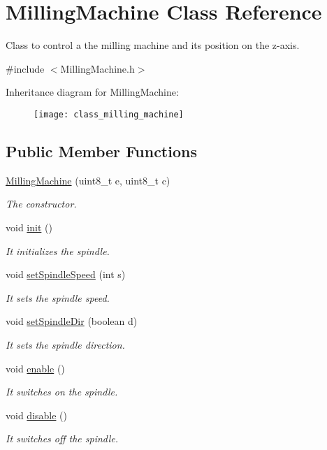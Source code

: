\hypertarget{class_milling_machine}{\section{Milling\+Machine Class Reference}
\label{class_milling_machine}
}


Class to control a the milling machine and its position on the z-\/axis.  




{\ttfamily \#include $<$Milling\+Machine.\+h$>$}

Inheritance diagram for Milling\+Machine\+:\begin{figure}[H]
\begin{center}
\leavevmode
\texttt{[image: class\_milling\_machine]}
\end{center}
\end{figure}
\subsection*{Public Member Functions}
\begin{DoxyCompactItemize}
\item 
\hyperlink{class_milling_machine_afdeaae37d959bd4c9de40195a2650aa4}{Milling\+Machine} (uint8\+\_\+t e, uint8\+\_\+t c)
\begin{DoxyCompactList}\small\item\em The constructor. \end{DoxyCompactList}\item 
void \hyperlink{class_milling_machine_ad8b30fc42959606e9773e5ae7e31bac7}{init} ()
\begin{DoxyCompactList}\small\item\em It initializes the spindle. \end{DoxyCompactList}\item 
void \hyperlink{class_milling_machine_a4c41fa0e6f882281ffc3b67a1771da57}{set\+Spindle\+Speed} (int s)
\begin{DoxyCompactList}\small\item\em It sets the spindle speed. \end{DoxyCompactList}\item 
void \hyperlink{class_milling_machine_a5c49cbbcd45406c9537ccac8f7c22c39}{set\+Spindle\+Dir} (boolean d)
\begin{DoxyCompactList}\small\item\em It sets the spindle direction. \end{DoxyCompactList}\item 
void \hyperlink{class_milling_machine_af965377184ed3bc3ed56763cd652d10f}{enable} ()
\begin{DoxyCompactList}\small\item\em It switches on the spindle. \end{DoxyCompactList}\item 
void \hyperlink{class_milling_machine_a6e1eb0b5f72e31ad0505b5f61613831d}{disable} ()
\begin{DoxyCompactList}\small\item\em It switches off the spindle. \end{DoxyCompactList}\end{DoxyCompactItemize}
